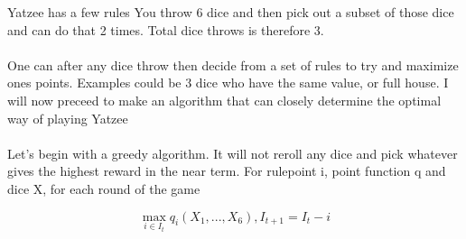 \documentclass[a4paper,12pt]{article}
\begin{document}
Yatzee has a few rules
You throw 6 dice and then pick out a subset of those dice and can do that
2 times. Total dice throws is therefore 3.

\paragraph{}
One can after any dice throw then decide from a set of rules to try and maximize
ones points. Examples could be 3 dice who have the same value, or full house. I will
now preceed to make an algorithm that can closely determine the optimal way of playing
Yatzee

\paragraph{}
Let's begin with a greedy algorithm. It will not reroll any dice and pick whatever gives
the highest reward in the near term. For rulepoint i, point function q and dice X,
for each round of the game

$$\max_{i\in I_t} q_i({X_1,...,X_6}), I_{t+1} = I_t - i$$
\end{document}
